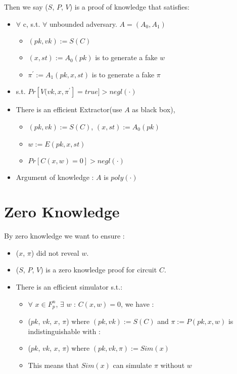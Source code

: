 \documentclass{article}
\begin{document}
Then we say ($S$, $P$, $V$) is a proof of knowledge that satisfies:


\begin{itemize}

        \item ${\forall}$ c, s.t.  ${\forall}$ unbounded adversary. $A = (A_0, A_1) $
        \begin{itemize}
            \item  $(pk, vk) := S(C)$
            \item  $(x, st) := A_0(pk)$ is to generate a fake $w$
            \item  $\pi^{\prime} := A_1(pk, x, st)$ is to generate a fake $\pi$
        \end{itemize}

        \item s.t.  $Pr[V(vk, x, \pi^{\prime}] = true] > negl(\cdot) $
        \item There is an efficient Extractor(use $A$ as black box),
        \begin{itemize}
            \item $(pk, vk) := S(C)$, $(x, st) := A_0(pk)$
            \item $w := E(pk, x, st)$
            \item $Pr[ C(x, w) = 0 ] > negl(\cdot)$
        \end{itemize}
        \item Argument of knowledge : $A$ is $poly(\cdot)$

\end{itemize}



\section{Zero Knowledge}

By zero knowledge we want to ensure :
\begin{itemize}
    \item ($x$, $\pi$) did not reveal $w$.
    \item ($S$, $P$, $V$) is a zero knowledge proof for circuit $C$.
    \item There is an efficient simulator s.t.:
    \begin{itemize}
        \item $\forall$ $x \in F_p^{n}$, $\exists$ $w$ : $C(x, w) = 0$, we have :
        \item ($pk$, $vk$, $x$, $\pi$) where $(pk, vk) := S(C)$ and $\pi := P(pk, x, w)$ is indistinguishable with :
        \item ($pk$, $vk$, $x$, $\pi$) where $(pk, vk, \pi) := Sim(x)$
        \item This means that $Sim(x)$ can simulate $\pi$ without $w$
    \end{itemize}
\end{itemize}
\end{document}
